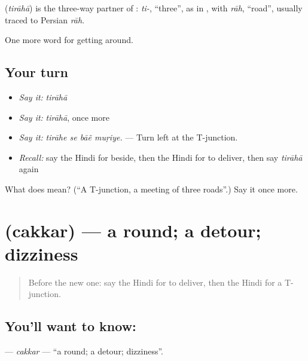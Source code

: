 \begin{cousinweb}
\textbf{} (\emph{tirāhā}) is the three-way partner of : \emph{ti-}, \textquotedblleft{}three\textquotedblright{}, as in , with \emph{rāh}, \textquotedblleft{}road\textquotedblright{}, usually traced to Persian \emph{rāh}.
\end{cousinweb}

\begin{grammarlens}[title={What you've built}]
One more word for getting around.
\end{grammarlens}

\subsection*{Your turn}
\begin{itemize}
\raggedright
  \item \emph{Say it:} \emph{tirāhā}
  \item \emph{Say it:} \emph{tirāhā}, once more
  \item \emph{Say it:} \emph{tirāhe se bāẽ muṛiye.} — Turn left at the T-junction.
  \item \emph{Recall:} say the Hindi for beside, then the Hindi for to deliver, then say \emph{tirāhā} again
\end{itemize}

\begin{tcolorbox}[breakable,colback=teal!4,colframe=teal!35!black,title={Before you move on}]
What does  mean? (\textquotedblleft{}A T-junction, a meeting of three roads\textquotedblright{}.) Say it once more.
\end{tcolorbox}
\section[\texorpdfstring{\hi{चक्कर} (cakkar)}{चक्कर (cakkar)}]{ (cakkar) — a round; a detour; dizziness}

\label{lesson:HI-C419-cakkar}



\begin{quote}
Before the new one: say the Hindi for to deliver, then the Hindi for a T-junction.
\end{quote}

\subsection*{You'll want to know: }
\textbf{} — \emph{cakkar} — \textquotedblleft{}a round; a detour; dizziness\textquotedblright{}.

